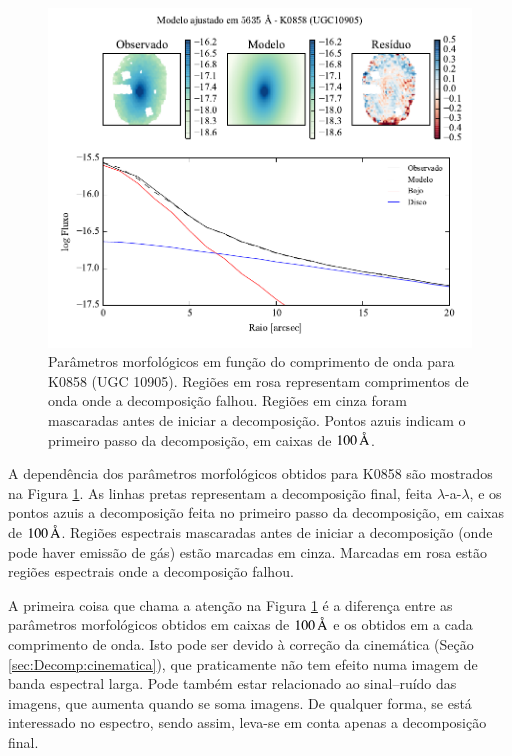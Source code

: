 \begin{figure}
	\includegraphics[page=2]{figuras-decomp/K0858_sample006a}
	\caption[Parâmetros morfológicos em função do comprimento de onda para K0858
	(UGC 10905)]
	{Parâmetros morfológicos em função do comprimento de onda para
	K0858 (UGC 10905). Regiões em rosa representam comprimentos de onda onde a
	decomposição falhou. Regiões em cinza foram mascaradas antes de iniciar a
	decomposição. Pontos azuis indicam o primeiro passo da decomposição, em caixas
	de $100\,\text{\normalfont\AA}$.}
	\label{fig:decompParams}
\end{figure}

A dependência dos parâmetros morfológicos obtidos para K0858 são mostrados na
Figura \ref{fig:decompParams}. As linhas pretas representam a decomposição
final, feita $\lambda$-a-$\lambda$, e os pontos azuis a decomposição feita no
primeiro passo da decomposição, em caixas de $100\,\text{\normalfont\AA}$. Regiões
espectrais mascaradas antes de iniciar a decomposição (onde pode haver emissão
de gás) estão marcadas em cinza. Marcadas em rosa estão regiões espectrais onde
a decomposição falhou.

A primeira coisa que chama a atenção na Figura \ref{fig:decompParams} é a
diferença entre as parâmetros morfológicos obtidos em caixas de $100\,\text{\normalfont\AA}$
e os obtidos em a cada comprimento de onda. Isto pode ser devido à correção da
cinemática (Seção \ref{sec:Decomp:cinematica}), que praticamente não tem efeito
numa imagem de banda espectral larga. Pode também estar relacionado ao
sinal--ruído das imagens, que aumenta quando se soma imagens. De qualquer forma,
se está interessado no espectro, sendo assim, leva-se em conta apenas a
decomposição final.

